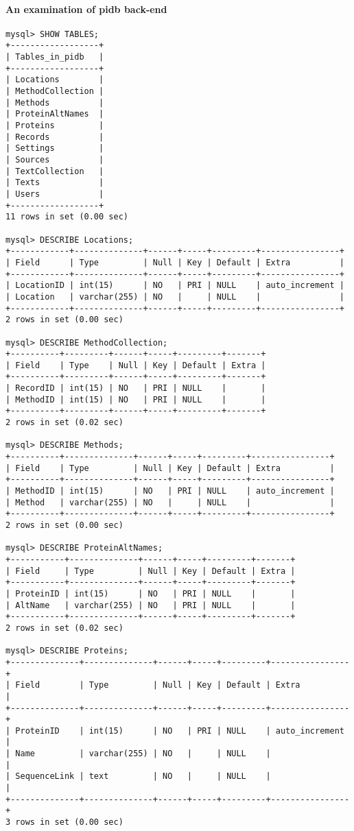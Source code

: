 \paragraph{An examination of pidb back-end}
\begin{verbatim}
mysql> SHOW TABLES;
+------------------+
| Tables_in_pidb   |
+------------------+
| Locations        |
| MethodCollection |
| Methods          |
| ProteinAltNames  |
| Proteins         |
| Records          |
| Settings         |
| Sources          |
| TextCollection   |
| Texts            |
| Users            |
+------------------+
11 rows in set (0.00 sec)

mysql> DESCRIBE Locations;
+------------+--------------+------+-----+---------+----------------+
| Field      | Type         | Null | Key | Default | Extra          |
+------------+--------------+------+-----+---------+----------------+
| LocationID | int(15)      | NO   | PRI | NULL    | auto_increment |
| Location   | varchar(255) | NO   |     | NULL    |                |
+------------+--------------+------+-----+---------+----------------+
2 rows in set (0.00 sec)

mysql> DESCRIBE MethodCollection;
+----------+---------+------+-----+---------+-------+
| Field    | Type    | Null | Key | Default | Extra |
+----------+---------+------+-----+---------+-------+
| RecordID | int(15) | NO   | PRI | NULL    |       |
| MethodID | int(15) | NO   | PRI | NULL    |       |
+----------+---------+------+-----+---------+-------+
2 rows in set (0.02 sec)

mysql> DESCRIBE Methods;
+----------+--------------+------+-----+---------+----------------+
| Field    | Type         | Null | Key | Default | Extra          |
+----------+--------------+------+-----+---------+----------------+
| MethodID | int(15)      | NO   | PRI | NULL    | auto_increment |
| Method   | varchar(255) | NO   |     | NULL    |                |
+----------+--------------+------+-----+---------+----------------+
2 rows in set (0.00 sec)

mysql> DESCRIBE ProteinAltNames;
+-----------+--------------+------+-----+---------+-------+
| Field     | Type         | Null | Key | Default | Extra |
+-----------+--------------+------+-----+---------+-------+
| ProteinID | int(15)      | NO   | PRI | NULL    |       |
| AltName   | varchar(255) | NO   | PRI | NULL    |       |
+-----------+--------------+------+-----+---------+-------+
2 rows in set (0.02 sec)

mysql> DESCRIBE Proteins;
+--------------+--------------+------+-----+---------+----------------+
| Field        | Type         | Null | Key | Default | Extra          |
+--------------+--------------+------+-----+---------+----------------+
| ProteinID    | int(15)      | NO   | PRI | NULL    | auto_increment |
| Name         | varchar(255) | NO   |     | NULL    |                |
| SequenceLink | text         | NO   |     | NULL    |                |
+--------------+--------------+------+-----+---------+----------------+
3 rows in set (0.00 sec)


\end{verbatim}
